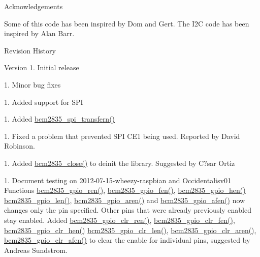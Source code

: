 \begin{DoxyParagraph}{Acknowledgements}

\end{DoxyParagraph}
Some of this code has been inspired by Dom and Gert. The I2C code has been inspired by Alan Barr.

\begin{DoxyParagraph}{Revision History}

\end{DoxyParagraph}
\begin{DoxyVersion}{Version}
1. Initial release 

1. Minor bug fixes 

1. Added support for SPI 

1. Added \mbox{\hyperlink{group__spi_ga06884e9cd71dfe380f846b09f47b7248}{bcm2835\+\_\+spi\+\_\+transfern()}} 

1. Fixed a problem that prevented SPI CE1 being used. Reported by David Robinson. 

1. Added \mbox{\hyperlink{group__init_ga3a42892f61764132d106a4ae32271002}{bcm2835\+\_\+close()}} to deinit the library. Suggested by C?sar Ortiz 

1. Document testing on 2012-\/07-\/15-\/wheezy-\/raspbian and Occidentalisv01 Functions \mbox{\hyperlink{group__gpio_ga5b70fa96491b9b1d9b3fb21bfefe2fd7}{bcm2835\+\_\+gpio\+\_\+ren()}}, \mbox{\hyperlink{group__gpio_gac9ea2f8c63f0330f12e1b24444d92e50}{bcm2835\+\_\+gpio\+\_\+fen()}}, \mbox{\hyperlink{group__gpio_ga2cb94aef80b49335057e338d71e46608}{bcm2835\+\_\+gpio\+\_\+hen()}} \mbox{\hyperlink{group__gpio_ga8e990d48db929445ac3e899ca0f5ed07}{bcm2835\+\_\+gpio\+\_\+len()}}, \mbox{\hyperlink{group__gpio_gaa77a0e0d39a6b4423419a16055ce71cc}{bcm2835\+\_\+gpio\+\_\+aren()}} and \mbox{\hyperlink{group__gpio_ga7e1f1686b60043c00327255e523d98f6}{bcm2835\+\_\+gpio\+\_\+afen()}} now changes only the pin specified. Other pins that were already previously enabled stay enabled. Added \mbox{\hyperlink{group__gpio_gaa5826edb1b17dd9095fa3bcae5ded485}{bcm2835\+\_\+gpio\+\_\+clr\+\_\+ren()}}, \mbox{\hyperlink{group__gpio_ga196b61d8bf334be6acec590de6dc8f88}{bcm2835\+\_\+gpio\+\_\+clr\+\_\+fen()}}, \mbox{\hyperlink{group__gpio_ga3c3b5297f5c2aeb5d2046a5b6de15d96}{bcm2835\+\_\+gpio\+\_\+clr\+\_\+hen()}} \mbox{\hyperlink{group__gpio_gac3b51f656f5495dad715ff3c01417aea}{bcm2835\+\_\+gpio\+\_\+clr\+\_\+len()}}, \mbox{\hyperlink{group__gpio_ga6f3e122871853b34d97b65284cf7cc47}{bcm2835\+\_\+gpio\+\_\+clr\+\_\+aren()}}, \mbox{\hyperlink{group__gpio_ga8ec8bf224e25ed395d4eecf3ad308ca3}{bcm2835\+\_\+gpio\+\_\+clr\+\_\+afen()}} to clear the enable for individual pins, suggested by Andreas Sundstrom. 


\end{DoxyVersion}
